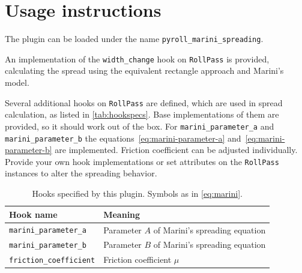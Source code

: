 \documentclass[11pt]{PyRollDocs}
\begin{document}
    \section{Usage instructions}\label{sec:usage-instructions}

    The plugin can be loaded under the name \texttt{pyroll\_marini\_spreading}.

    An implementation of the \lstinline{width_change} hook on \lstinline{RollPass} is provided,
    calculating the spread using the equivalent rectangle approach and Marini's model.

    Several additional hooks on \lstinline{RollPass} are defined, which are used in spread calculation, as listed in \autoref{tab:hookspecs}.
    Base implementations of them are provided, so it should work out of the box.
    For \lstinline{marini_parameter_a} and \lstinline{marini_parameter_b} the equations~\ref{eq:marini-parameter-a} and~\ref{eq:marini-parameter-b} are implemented.
    Friction coefficient can be adjusted individually.
    Provide your own hook implementations or set attributes on the \lstinline{RollPass} instances to alter the spreading behavior.

    \begin{table}
        \centering
        \caption{Hooks specified by this plugin. Symbols as in \autoref{eq:marini}.}
        \label{tab:hookspecs}
        \begin{tabular}{ll}
            \toprule
            Hook name                     & Meaning                                      \\
            \midrule
            \texttt{marini\_parameter\_a}   & Parameter $A$ of Marini's spreading equation \\
            \texttt{marini\_parameter\_b}   & Parameter $B$ of Marini's spreading equation \\
            \texttt{friction\_coefficient} & Friction coefficient $\mu$                   \\
            \bottomrule
        \end{tabular}
    \end{table}

    \printbibliography
\end{document}
